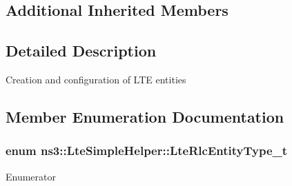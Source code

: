 \subsection*{Additional Inherited Members}


\subsection{Detailed Description}
Creation and configuration of L\+TE entities 

\subsection{Member Enumeration Documentation}
\subsubsection[{\texorpdfstring{Lte\+Rlc\+Entity\+Type\+\_\+t}{LteRlcEntityType_t}}]{\setlength{\rightskip}{0pt plus 5cm}enum {\bf ns3\+::\+Lte\+Simple\+Helper\+::\+Lte\+Rlc\+Entity\+Type\+\_\+t}\hspace{0.3cm}{\ttfamily [private]}}\hypertarget{classns3_1_1LteSimpleHelper_a9b2b072cbdc391cd95182aa16048befc}{}\label{classns3_1_1LteSimpleHelper_a9b2b072cbdc391cd95182aa16048befc}
\begin{Desc}
\item[Enumerator]\par
\begin{description}
\item[{\em 
R\+L\+C\+\_\+\+UM\hypertarget{classns3_1_1LteSimpleHelper_a9b2b072cbdc391cd95182aa16048befcafd0e89cd3022420fb4b4aac5a5d7484f}{}\label{classns3_1_1LteSimpleHelper_a9b2b072cbdc391cd95182aa16048befcafd0e89cd3022420fb4b4aac5a5d7484f}
}]\item[{\em 
R\+L\+C\+\_\+\+AM\hypertarget{classns3_1_1LteSimpleHelper_a9b2b072cbdc391cd95182aa16048befca1a9cce9654ef5019efbeeee1360d0276}{}\label{classns3_1_1LteSimpleHelper_a9b2b072cbdc391cd95182aa16048befca1a9cce9654ef5019efbeeee1360d0276}
}]\end{description}
\end{Desc}

